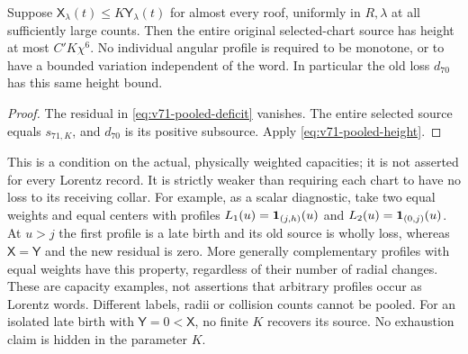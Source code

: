 \begin{corollary}
\label{cor:v71-reserve-class}
Suppose $\mathsf X_\lambda(t)\le K\mathsf Y_\lambda(t)$ for
almost every roof, uniformly in $R,\lambda$ at all sufficiently
large counts. Then the entire original selected-chart source has
height at most $C'K\chi^6$. No individual angular profile is required
to be monotone, or to have a bounded variation independent of the
word. In particular the old loss $d_{70}$ has this same height bound.
\end{corollary}
\begin{proof}
The residual in \eqref{eq:v71-pooled-deficit} vanishes. The entire
selected source equals $s_{71,K}$, and $d_{70}$ is its positive
subsource. Apply \eqref{eq:v71-pooled-height}.
\end{proof}

This is a condition on the actual, physically weighted capacities;
it is not asserted for every Lorentz record. It is strictly weaker
than requiring each chart to have no loss to its receiving collar.
For example, as a scalar diagnostic, take two equal weights and equal
centers with profiles $L_1(u)=\mathbf1_{(j,h)}(u)$ and
$L_2(u)=\mathbf1_{(0,j)}(u)$. At $u>j$ the first profile is a late
birth and its old source is wholly loss, whereas
$\mathsf X=\mathsf Y$ and the new residual is zero. More generally
complementary profiles with equal weights have this property,
regardless of their number of radial changes. These are capacity
examples, not assertions that arbitrary profiles occur as Lorentz
words. Different labels, radii or collision counts cannot be pooled.
For an isolated late birth with $\mathsf Y=0<\mathsf X$, no finite
$K$ recovers its source. No exhaustion claim is hidden in the parameter
$K$.
